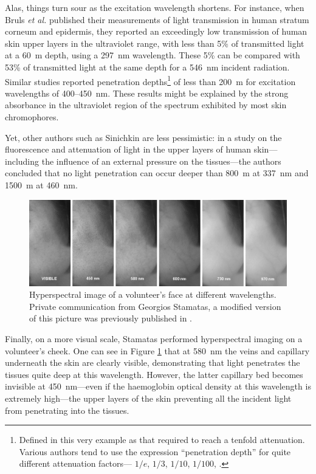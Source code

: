 Alas, things turn sour as the excitation wavelength shortens. For instance, when Bruls \textit{et al.}\cite{bruls1984} published their measurements of light transmission in human stratum corneum and epidermis, they reported an exceedingly low transmission of human skin upper layers in the ultraviolet range, with less than 5\% of transmitted light at a 60~\textmu{}m depth, using a 297~nm wavelength. These 5\% can be compared with 53\% of transmitted light at the same depth for a 546~nm incident radiation. Similar studies reported penetration depths\footnote{Defined in this very example as that required to reach a tenfold attenuation. Various authors tend to use the expression \enquote{penetration depth} for quite different attenuation factors---\eg{} $1/e$, $1/3$, $1/10$, $1/100$, \etc{}.} of less than 200~\textmu{}m for excitation wavelengths of 400--450~nm\cite{gmitro1988, koenig1998, barun2007}. These results might be explained by the strong absorbance in the ultraviolet region of the spectrum exhibited by most skin chromophores\cite{young1997}.

Yet, other authors such as Sinichkin \etal{} are less pessimistic: in a study on the fluorescence and attenuation of light in the upper layers of human skin---including the influence of an external pressure on the tissues---the authors concluded that no light penetration can occur deeper than 800~\textmu{}m at 337~nm and 1500~\textmu{}m at 460~nm\cite{sinichkin1998}.

\begin{figure}
	\centering
	\includegraphics[width=\linewidth]{1_main_matter/co2hb_figures/stamatas_hs.png}
	\caption[Hyperspectral image of a volunteer's face at different wavelengths.]{Hyperspectral image of a volunteer's face at different wavelengths. Private communication from Georgios Stamatas, a modified version of this picture was previously published in \cite{stamatas2003}.}
	\label{fig:co2hb:stamatas_fig}
\end{figure}

Finally, on a more visual scale, Stamatas \etal{}\cite{stamatas2003} performed hyperspectral imaging on a volunteer's cheek. One can see in Figure \ref{fig:co2hb:stamatas_fig} that at 580~nm the veins and capillary underneath the skin are clearly visible, demonstrating that light penetrates the tissues quite deep at this wavelength. However, the latter capillary bed becomes invisible at 450~nm---even if the haemoglobin optical density at this wavelength is extremely high---the upper layers of the skin preventing all the incident light from penetrating into the tissues.

